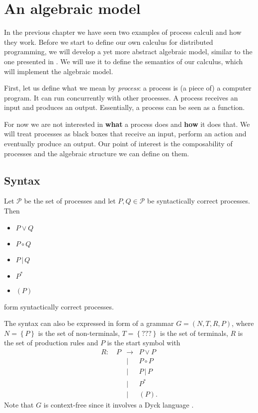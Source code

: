 \chapter{An algebraic model}
\label{chp:algebraic_model}
In the previous chapter we have seen two examples of process calculi and how they work. Before we start to define our own calculus for distributed programming, we will develop a yet more abstract algebraic model, similar to the one presented in \cite{Hoare:2012:LPU:2368298.2368301}. We will use it to define the semantics of our calculus, which will implement the algebraic model.

First, let us define what we mean by \textit{process}: a process is (a piece of) a computer program. It can run concurrently with other processes. A process receives an input and produces an output. Essentially, a process can be seen as a function. %

For now we are not interested in \textbf{what} a process does and \textbf{how} it does that. We will treat processes as black boxes that receive an input, perform an action and eventually produce an output. Our point of interest is the composability of processes and the algebraic structure we can define on them.

\section{Syntax}

Let $\mathcal{P}$ be the set of processes and let $P, Q \in \mathcal{P}$ be syntactically correct processes. Then
\begin{itemize}
  \item $P \vee Q$
  \vspace*{-0.25em}
  \item $P \circ Q$
  \vspace*{-0.25em}
  \item $P \,|\, Q$
  \vspace*{-0.25em}
  \item $P^*$
  \vspace*{-0.25em}
  \item $\left( P \right)$
\end{itemize}
form syntactically correct processes.

The syntax can also be expressed in form of a grammar $G = \left( N, T, R, P \right)$, where $N = \left\{ P \right\}$ is the set of non-terminals, $T = \left\{ ??? \right\}$ is the set of terminals, $R$ is the set of production rules and $P$ is the start symbol \cite{Hopcroft:2006:IAT:1196416} with %
\begin{eqnarray*}
  R \colon \quad P & \to & P \vee P \\
    & | & P \circ P \\
    & | & P \,|\, P \\
    & | & P^* \\
    & | & \left( P \right).
\end{eqnarray*}
Note that $G$ is context-free since it involves a Dyck language \cite{}.


